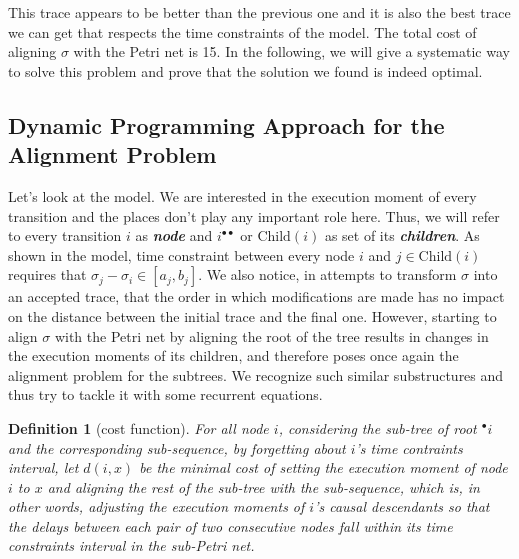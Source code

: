 \documentclass{article}
\newtheorem{theorem}{Definition}
\begin{document}
This trace appears to be better than the previous one and it is also the best trace we can get that 
respects the time constraints of the model. The total cost of aligning $\sigma$ with the Petri net is 15.
In the following, we will give a systematic way to solve this problem and prove that the solution we found is indeed optimal.


\subsection{Dynamic Programming Approach for the Alignment Problem}
Let's look at the model. We are interested in the execution moment of every transition and the places don't play any important role here. Thus, we will refer to every transition $i$ as \textit{\textbf{node}} and $i^{\bullet\bullet}$ or $\text{Child}(i)$ as set of its \textit{\textbf{children}}.
As shown in the model, time constraint between every node $i$ and $j \in \text{Child}(i)$ requires that $\sigma_{j} - \sigma_{i} \in [a_{j}, b_{j}]$. We also notice, in attempts to transform $\sigma$ into an accepted trace, that the order in which modifications are made has no impact on the distance between the initial trace and the final one. However, starting to align $\sigma$ with the Petri net by aligning the root of the tree results in changes in the execution moments of its children, and therefore poses once again the alignment problem for the subtrees. We recognize such similar substructures and thus try to tackle it with some recurrent equations.


\begin{theorem}[cost function]
    For all node $i$, considering the sub-tree of root ${}^\bullet i$ and the corresponding sub-sequence, by forgetting about $i$'s time contraints interval, let $d(i,x)$ be the minimal cost of setting the execution moment of node $i$ to $x$ and aligning the rest of the sub-tree with the sub-sequence, which is, in other words, adjusting the execution moments of $i$'s causal descendants so that the delays between each pair of two consecutive nodes fall within its time constraints interval in the sub-Petri net. 
\end{theorem}
\end{document}
